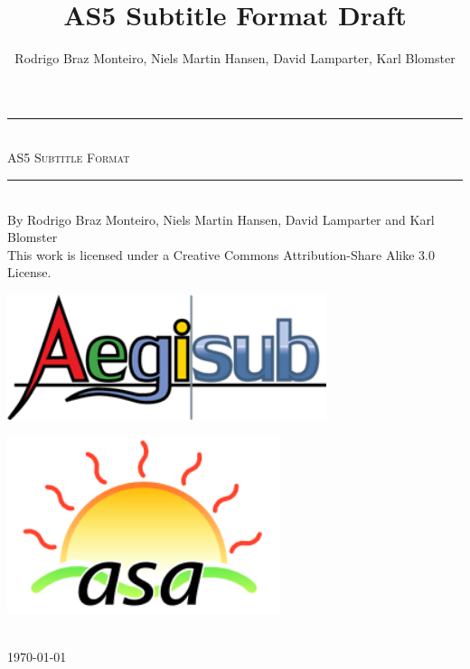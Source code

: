 \documentclass{spec}
\newcommand{\HRule}{\rule{\linewidth}{0.5mm}}
\begin{document}
\title{AS5 Subtitle Format Draft}
\author{Rodrigo Braz Monteiro, Niels Martin Hansen, David Lamparter, Karl Blomster}

\begin{titlepage}
\begin{center}

\vspace*{3cm}

\HRule \\[0.5cm]
\textsc{\huge AS5 Subtitle Format}\\
\HRule \\[1.1cm]
{\large By Rodrigo Braz Monteiro, Niels Martin Hansen, David Lamparter and Karl Blomster}\\[0.3cm]
This work is licensed under a Creative Commons Attribution-Share Alike 3.0 License.\\
\vfill

\begin{minipage}{0.4\textwidth}
\begin{flushleft} \large
\includegraphics[width=0.7\textwidth]{./aegisub}
\end{flushleft}
\end{minipage}
\begin{minipage}{0.4\textwidth}
\begin{flushright} \large
\includegraphics[width=0.6\textwidth]{./asa}
\end{flushright}
\end{minipage}\\[1.5cm]

{\large \today}

\end{center}
\end{titlepage}
\end{document}
